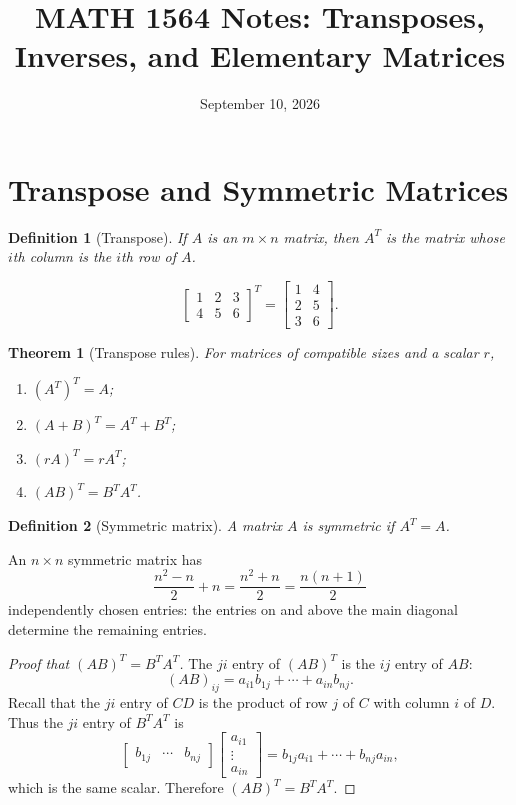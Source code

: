 \documentclass[11pt]{article}
\title{MATH 1564 Notes: Transposes, Inverses, and Elementary Matrices}
\author{}
\date{September 10, 2026}
\newtheorem*{theorem}{Theorem}
\newtheorem*{definition}{Definition}
\begin{document}
\maketitle
\tableofcontents
\vspace{0.75em}

\section{Transpose and Symmetric Matrices}

\begin{definition}[Transpose]
If $A$ is an $m\times n$ matrix, then $A^{T}$ is the matrix whose $i$th column is the $i$th row of $A$.
\end{definition}

\[\begin{bmatrix}1&2&3\\4&5&6\end{bmatrix}^{T}
=\begin{bmatrix}1&4\\2&5\\3&6\end{bmatrix}.\]

\begin{theorem}[Transpose rules]
For matrices of compatible sizes and a scalar $r$,
\begin{enumerate}
  \item $(A^{T})^{T}=A$;
  \item $(A+B)^{T}=A^{T}+B^{T}$;
  \item $(rA)^{T}=rA^{T}$;
  \item $(AB)^{T}=B^{T}A^{T}$.
\end{enumerate}
\end{theorem}

\begin{definition}[Symmetric matrix]
A matrix $A$ is \emph{symmetric} if $A^{T}=A$.
\end{definition}

An $n\times n$ symmetric matrix has
\[
\frac{n^2-n}{2}+n=\frac{n^2+n}{2}=\frac{n(n+1)}2
\]
independently chosen entries: the entries on and above the main diagonal determine the remaining entries.

\begin{proof}[Proof that $(AB)^T=B^TA^T$]
The $ji$ entry of $(AB)^T$ is the $ij$ entry of $AB$:
\[
(AB)_{ij}=a_{i1}b_{1j}+\cdots+a_{in}b_{nj}.
\]
Recall that the $ji$ entry of $CD$ is the product of row $j$ of $C$ with column $i$ of $D$.  Thus the $ji$ entry of $B^TA^T$ is
\[
\begin{bmatrix}b_{1j}&\cdots&b_{nj}\end{bmatrix}
\begin{bmatrix}a_{i1}\\ \vdots\\ a_{in}\end{bmatrix}
=b_{1j}a_{i1}+\cdots+b_{nj}a_{in},
\]
which is the same scalar.  Therefore $(AB)^T=B^TA^T$.
\end{proof}
\end{document}
